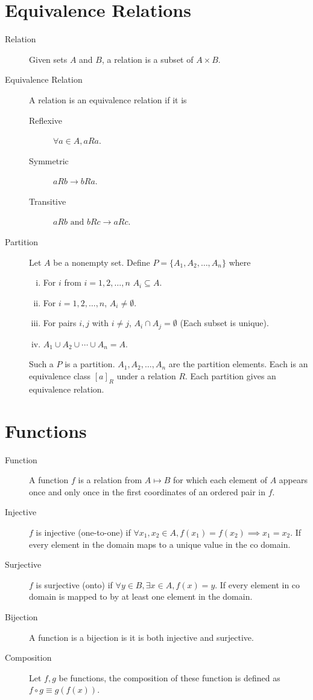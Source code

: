 \documentclass[../main.tex]{subfiles}
\begin{document}
\section{Equivalence Relations}
\label{sec:equivalence_relations}

\begin{description}
  \item[Relation] Given sets $A$ and $B$, a relation is a subset of $A\times B$.
  \item[Equivalence Relation] A relation is an equivalence relation if it is
    \begin{description}
      \item[Reflexive] $\forall a\in A, aRa$.
      \item[Symmetric] $aRb \to bRa$.
      \item[Transitive] $aRb \text{ and } bRc \to aRc$.
    \end{description}
  \item[Partition] Let $A$ be a nonempty set. Define $P=\{A_1, A_2, \ldots,
    A_n\}$ where
    \begin{enumerate}[(i)]
      \item For $i$ from $i=1,2,\ldots,n$ $A_i\subseteq A$.
      \item For $i=1,2,\ldots,n$, $A_i\neq\emptyset$.
      \item For pairs $i,j$ with $i\neq j$, $A_i\cap A_j = \emptyset$ (Each
        subset is unique).
      \item $A_1\cup A_2\cup \cdots\cup A_n=A$.
    \end{enumerate}
    Such a $P$ is a partition. $A_1,A_2,\ldots,A_n$ are the partition elements.
    Each is an equivalence class ${\left[a\right]}_R$ under a relation $R$.
    Each partition gives an equivalence relation.
\end{description}

\section{Functions}
\label{sec:functions}

\begin{description}
  \item[Function] A function $f$ is a relation from $A\mapsto B$ for which each
    element of $A$ appears once and only once in the first coordinates of an
    ordered pair in $f$.
  \item[Injective] $f$ is injective (one-to-one) if $\forall x_1, x_2\in A,
    f\left(x_1\right)=f\left(x_2\right)\implies x_1 = x_2$. If every element in
    the domain maps to a unique value in the co domain.
  \item[Surjective] $f$ is surjective (onto) if $\forall y\in B, \exists x\in
    A, f(x) = y$. If every element in co domain is mapped to by at least one
    element in the domain.
  \item[Bijection] A function is a bijection is it is both injective and
    surjective.
  \item[Composition] Let $f,g$ be functions, the composition of these function
    is defined as $f\circ g \equiv g\left(f\left(x\right)\right)$.
\end{description}
\end{document}
